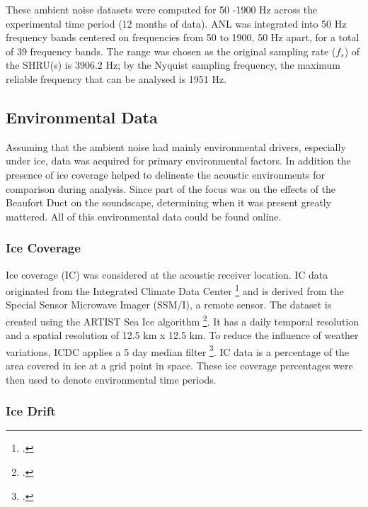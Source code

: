 
These ambient noise datasets were computed for 50 -1900 Hz across the experimental time period (12 months of data). ANL was integrated into 50 Hz frequency bands centered on frequencies from 50 to 1900, 50 Hz apart, for a total of 39 frequency bands. The range was chosen as the original sampling rate ($f_{s}$) of the SHRU(s) is  3906.2 Hz; by the Nyquist sampling frequency, the maximum reliable frequency that can be analysed is 1951 Hz.

\subsection{Environmental Data} \label{intro_env_info}

Assuming that the ambient noise had mainly environmental drivers, especially under ice, data was acquired for primary environmental factors. In addition the presence of ice coverage helped to delineate the acoustic environments for comparison during analysis. Since part of the focus was on the effects of the Beaufort Duct on the soundscape, determining when it was present greatly mattered. All of this environmental data could be found online.
\subsubsection{Ice Coverage} \label{intro_env_ice_cov}

Ice coverage (IC) was considered at the acoustic receiver location. IC data originated from the Integrated Climate Data Center \footcite[]{kaleschke2001ssm} and is derived from the Special Sensor Microwave Imager (SSM/I), a remote sensor. The dataset is created using the ARTIST Sea Ice algorithm \footcite[]{spreen2008sea}. It has a daily temporal resolution and a spatial resolution of 12.5 km x 12.5 km. To reduce the influence of weather variations, ICDC applies a 5 day median filter \footcite[]{kern2010climatology}. IC data is a percentage of the area covered in ice at a grid point in space. These ice coverage percentages were then used to denote environmental time periods.

\subsubsection{Ice Drift} \label{intro_env_ice_dri}


